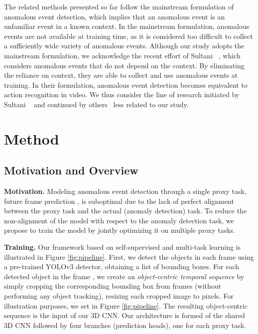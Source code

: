 \documentclass[final]{cvpr}
\begin{document}
The related methods presented so far follow the mainstream formulation of anomalous event detection, which implies that an anomalous event is an unfamiliar event in a known context. In the mainstream formulation, anomalous events are not available at training time, as it is considered too difficult to collect a sufficiently wide variety of anomalous events. Although our study adopts the mainstream formulation, we acknowledge the recent effort of Sultani \etal~\cite{Sultani-CVPR-2018}, which considers anomalous events that do not depend on the context. By eliminating the reliance on context, they are able to collect and use anomalous events at training. In their formulation, anomalous event detection becomes equivalent to action recognition in video. We thus consider the line of research initiated by Sultani \etal~\cite{Sultani-CVPR-2018} and continued by others~\cite{Zhong-CVPR-2019} less related to our study.

\vspace*{-0.1cm}
\section{Method}
\label{sec_method}
\vspace{-0.1cm}
\subsection{Motivation and Overview}
\vspace*{-0.1cm}

\noindent
{\bf Motivation.}
Modeling anomalous event detection through a single proxy task, \eg future frame prediction \cite{Liu-CVPR-2018}, is suboptimal due to the lack of perfect alignment between the proxy task and the actual (anomaly detection) task. To reduce the non-alignment of the model with respect to the anomaly detection task, we propose to train the model by jointly optimizing it on multiple proxy tasks.

\noindent
{\bf Training.}
Our framework based on self-supervised and multi-task learning is illustrated in Figure \ref{fig:pipeline}. First, we detect the objects in each frame using a pre-trained YOLOv3 \cite{Redmon-arXiv-2018} detector, obtaining a list of bounding boxes. For each detected object in the frame , we create an \emph{object-centric temporal sequence} by simply cropping the corresponding bounding box from frames  (without performing any object tracking), resizing each cropped image to  pixels. For illustration purposes, we set  in Figure \ref{fig:pipeline}. The resulting object-centric sequence is the input of our 3D CNN. Our architecture is formed of the shared 3D CNN followed by four branches (prediction heads), one for each proxy task. 
\end{document}
